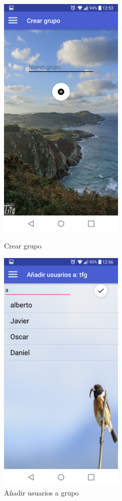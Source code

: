 \begin{figure}[htbp]
\begin{minipage}[b]{0.5\linewidth} %
\centering
\includegraphics[width=6cm]{capturamovil/creargrupo.png}
\caption{Crear grupo}
 \label{fig:creargrupo}

\end{minipage}
\hspace{0.5cm} %
\begin{minipage}[b]{0.5\linewidth}
\centering
\includegraphics[width=6cm]{capturamovil/addintegrante.png}

\caption{Añadir usuarios a grupo }
 \label{fig:addintegrante}
\end{minipage}
\end{figure}


